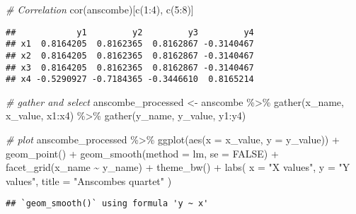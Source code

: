 \documentclass[
]{book}
\newenvironment{Shaded}{\begin{snugshade}}{\end{snugshade}}
\newcommand{\AttributeTok}[1]{\textcolor[rgb]{0.77,0.63,0.00}{#1}}
\newcommand{\CommentTok}[1]{\textcolor[rgb]{0.56,0.35,0.01}{\textit{#1}}}
\newcommand{\ConstantTok}[1]{\textcolor[rgb]{0.00,0.00,0.00}{#1}}
\newcommand{\DecValTok}[1]{\textcolor[rgb]{0.00,0.00,0.81}{#1}}
\newcommand{\FunctionTok}[1]{\textcolor[rgb]{0.00,0.00,0.00}{#1}}
\newcommand{\NormalTok}[1]{#1}
\newcommand{\OtherTok}[1]{\textcolor[rgb]{0.56,0.35,0.01}{#1}}
\newcommand{\SpecialCharTok}[1]{\textcolor[rgb]{0.00,0.00,0.00}{#1}}
\newcommand{\StringTok}[1]{\textcolor[rgb]{0.31,0.60,0.02}{#1}}
\begin{document}
\begin{Shaded}
\begin{Highlighting}[]
\CommentTok{\# Correlation}
\FunctionTok{cor}\NormalTok{(anscombe)[}\FunctionTok{c}\NormalTok{(}\DecValTok{1}\SpecialCharTok{:}\DecValTok{4}\NormalTok{), }\FunctionTok{c}\NormalTok{(}\DecValTok{5}\SpecialCharTok{:}\DecValTok{8}\NormalTok{)]}
\end{Highlighting}
\end{Shaded}

\begin{verbatim}
##            y1         y2         y3         y4
## x1  0.8164205  0.8162365  0.8162867 -0.3140467
## x2  0.8164205  0.8162365  0.8162867 -0.3140467
## x3  0.8164205  0.8162365  0.8162867 -0.3140467
## x4 -0.5290927 -0.7184365 -0.3446610  0.8165214
\end{verbatim}

\begin{Shaded}
\begin{Highlighting}[]
\CommentTok{\# gather and select}
\NormalTok{anscombe\_processed }\OtherTok{\textless{}{-}}\NormalTok{ anscombe }\SpecialCharTok{\%\textgreater{}\%}
  \FunctionTok{gather}\NormalTok{(x\_name, x\_value, x1}\SpecialCharTok{:}\NormalTok{x4) }\SpecialCharTok{\%\textgreater{}\%}
  \FunctionTok{gather}\NormalTok{(y\_name, y\_value, y1}\SpecialCharTok{:}\NormalTok{y4)}

\CommentTok{\# plot}
\NormalTok{anscombe\_processed }\SpecialCharTok{\%\textgreater{}\%}
  \FunctionTok{ggplot}\NormalTok{(}\FunctionTok{aes}\NormalTok{(}\AttributeTok{x =}\NormalTok{ x\_value, }\AttributeTok{y =}\NormalTok{ y\_value)) }\SpecialCharTok{+}
  \FunctionTok{geom\_point}\NormalTok{() }\SpecialCharTok{+}
  \FunctionTok{geom\_smooth}\NormalTok{(}\AttributeTok{method =}\NormalTok{ lm, }\AttributeTok{se =} \ConstantTok{FALSE}\NormalTok{) }\SpecialCharTok{+}
  \FunctionTok{facet\_grid}\NormalTok{(x\_name }\SpecialCharTok{\textasciitilde{}}\NormalTok{ y\_name) }\SpecialCharTok{+}
  \FunctionTok{theme\_bw}\NormalTok{() }\SpecialCharTok{+}
  \FunctionTok{labs}\NormalTok{(}
    \AttributeTok{x =} \StringTok{"X values"}\NormalTok{,}
    \AttributeTok{y =} \StringTok{"Y values"}\NormalTok{,}
    \AttributeTok{title =} \StringTok{"Anscombe\textquotesingle{}s quartet"}
\NormalTok{  )}
\end{Highlighting}
\end{Shaded}

\begin{verbatim}
## `geom_smooth()` using formula 'y ~ x'
\end{verbatim}
\end{document}
